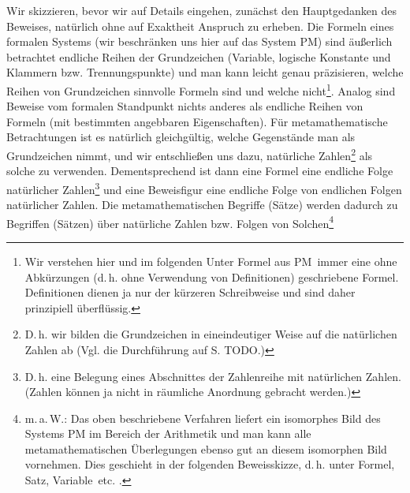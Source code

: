 \documentclass[draft]{scrartcl}
\newcounter{commentaryNumber}
\begin{document}
Wir skizzieren, bevor wir auf Details eingehen, zunächst
den Hauptgedanken des Beweises, natürlich ohne auf 
Exaktheit Anspruch zu erheben. Die Formeln eines formalen Systems (wir beschränken uns hier auf das System PM) sind
äußerlich betrachtet endliche Reihen der Grundzeichen
(Variable, logische Konstante und Klammern bzw.
Trennungspunkte) und man kann leicht genau präzisieren,
welche Reihen von Grundzeichen sinnvolle Formeln sind
und welche nicht\footnote{Wir verstehen hier und im folgenden
Unter \glqq Formel aus PM\grqq\ immer eine ohne Abkürzungen 
(d.\,h. ohne Verwendung von Definitionen)
geschriebene Formel. Definitionen dienen ja nur der kürzeren
Schreibweise und sind daher prinzipiell überflüssig.}.
Analog sind Beweise vom formalen Standpunkt nichts anderes
als endliche Reihen von Formeln (mit bestimmten angebbaren
Eigenschaften). Für metamathematische Betrachtungen
ist es natürlich gleichgültig, welche Gegenstände man
als Grundzeichen nimmt, und wir entschließen uns dazu,
natürliche Zahlen\footnote{D.\,h. wir bilden die Grundzeichen 
in eineindeutiger Weise auf die natürlichen Zahlen ab (Vgl. die Durchführung auf S. TODO.)}
als solche zu verwenden. Dementsprechend ist dann eine
Formel eine endliche Folge natürlicher 
Zahlen\footnote{D.\,h. eine Belegung eines Abschnittes der 
Zahlenreihe mit natürlichen Zahlen. (Zahlen können ja nicht in
räumliche Anordnung gebracht werden.)} und eine Beweisfigur eine
endliche Folge von endlichen Folgen natürlicher Zahlen.
Die metamathematischen Begriffe (Sätze) werden dadurch zu
Begriffen (Sätzen) über natürliche Zahlen bzw. Folgen von
Solchen\footnote{m.\,a.\,W.: Das oben beschriebene Verfahren 
liefert ein isomorphes Bild des Systems PM im Bereich der
Arithmetik und man kann alle metamathematischen Überlegungen
ebenso gut an diesem isomorphen Bild vornehmen. Dies geschieht 
in der folgenden Beweisskizze, d.\,h. unter \glqq Formel\grqq, 
\glqq Satz\grqq, \glqq Variable\grqq\ etc. 
.}
\end{document}
